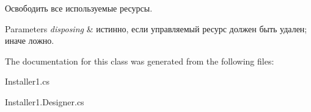 Освободить все используемые ресурсы. 


\begin{DoxyParams}{Parameters}
{\em disposing} & истинно, если управляемый ресурс должен быть удален; иначе ложно.\\
\hline
\end{DoxyParams}


The documentation for this class was generated from the following files\+:\begin{DoxyCompactItemize}
\item 
Installer1.\+cs\item 
Installer1.\+Designer.\+cs\end{DoxyCompactItemize}
